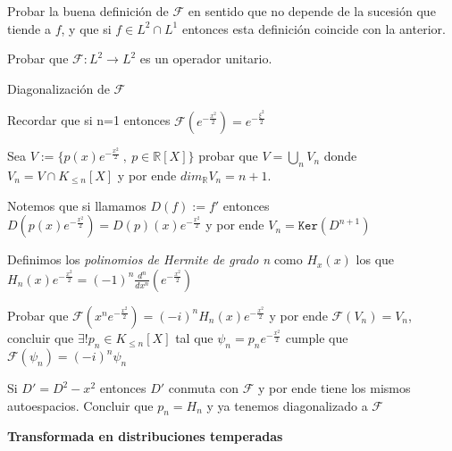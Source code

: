 \documentclass[11pt]{article}
\newcommand{\R}{{\mathbb{R}}}
\newenvironment{definition}[1][Definici\'on]{\begin{trivlist}
\item[\hskip \labelsep {\bfseries #1}]}{\end{trivlist}}
\newcommand{\F}{\mathcal{F}}
\begin{document}
\begin{enumerate}
\begin{definition}
\end{definition}

\item Probar la buena definici\'on de $\F$ en sentido que no depende de la sucesi\'on que tiende a $f$, y que si $f \in L^2 \cap L^1$ entonces esta definici\'on coincide con la anterior.

\item Probar que $\F: L^2 \rightarrow L^2$ es un operador unitario.

\item {Diagonalizaci\'on de $\F$}

\begin{enumerate}

\item Recordar que si n=1 entonces $\F(e^{-\frac{x^2}{2}}) = e^{-\frac{\xi^2}{2}}$

\item Sea $V := \{ p(x)e^{-\frac{x^2}{2}} \ , \ p \in \R[X]\}$ probar que $V = \bigcup_{n}{V_n}$ donde $V_n = V \cap K_{\leq n}[X]$ y por ende $dim_{\R}{V_n}=n+1$.

\item Notemos que si llamamos $\mathit{D}(f) := f'$ entonces $\mathit{D}(p(x)e^{-\frac{x^2}{2}}) = D(p)(x)e^{-\frac{x^2}{2}}$ y por ende $V_n = \mathtt{Ker}(D^{n+1})$

\begin{definition}

Definimos los \textit{polinomios de Hermite de grado n} como $H_x(x)$ los que $H_n(x)e^{-\frac{x^2}{2}} = (-1)^n \frac{d^n}{dx^n}(e^{-\frac{x^2}{2}})$

\end{definition}

\item Probar que $\F(x^n e^{-\frac{x^2}{2}} ) = (-i)^n H_n(x) e^{-\frac{x^2}{2}}$ y por ende $\F(V_n)=V_n$, concluir que $\exists! p_n \in K_{\leq n}[X]$ tal que $\psi_n = p_n e^{-\frac{x^2}{2}}$ cumple que $\F(\psi_n) = (-i)^n \psi_n$

\item Si $\mathit{D'} = D^2 - x^2$ entonces $\mathit{D'}$ conmuta con $\F$ y por ende tiene los mismos autoespacios. Concluir que $p_n = H_n$ y ya tenemos diagonalizado a $\F$

\end{enumerate}

\bigskip

\textbf{Transformada en distribuciones temperadas}

\begin{definition}


\end{definition}
\end{enumerate}
\end{document}
